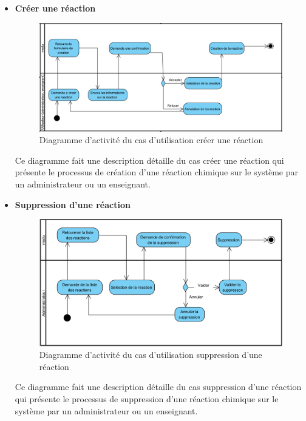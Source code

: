 \begin{itemize}
	\item \textbf{Créer une réaction }

	      \begin{figure}[H]
		      \centering
		      \includegraphics[width=1\textwidth]{img/sdCUR}
		      \caption{Diagramme d’activité du cas d'utilisation créer une réaction}
		      \label{fig:mesh1}
	      \end{figure}

	      Ce diagramme fait une description détaille du cas créer une réaction qui présente le processus de création d’une réaction chimique sur le système par un administrateur ou un enseignant.
	
	\newpage
	\item \textbf{Suppression d’une réaction}

	      \begin{figure}[H]
		      \centering
		      \includegraphics[width=1\textwidth]{img/adsr}
		      \caption{Diagramme d’activité du cas d'utilisation suppression d’une réaction}
		      \label{fig:mesh1}
	      \end{figure}

	      Ce diagramme fait une description détaille du cas suppression d’une réaction qui présente le processus de suppression d’une réaction chimique sur le système par un administrateur ou un enseignant.
\end{itemize}

